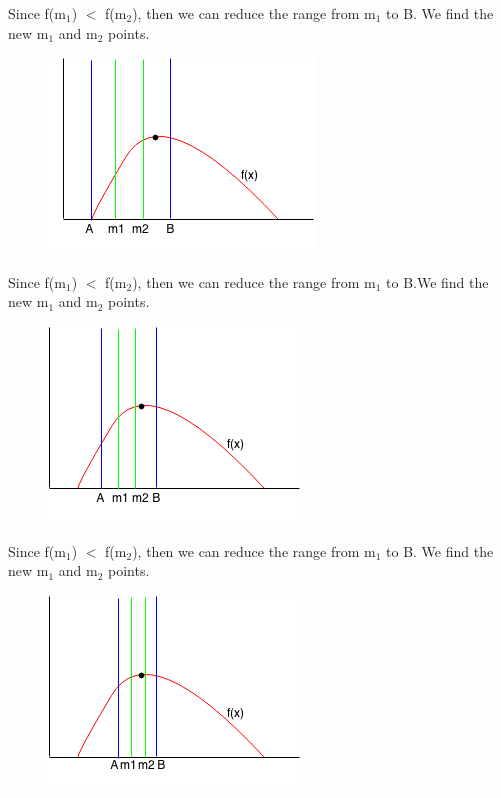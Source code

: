 \documentclass[11pt,oneside]{book}
\makeatletter
\def\maxwidth#1{\ifdim\Gin@nat@width>#1 #1\else\Gin@nat@width\fi}
\makeatother
\begin{document}
Since f(m$_{1}$) $<$ f(m$_{2}$), then we can reduce the range from m$_{1}$ to B. We find the new m$_{1}$ and m$_{2}$ points.

\vspace{5px}\begin{figure}[H]\centering
        \includegraphics[width=0.66\maxwidth{\textwidth}]{ternarysearch4.png}
        \end{figure}

Since f(m$_{1}$) $<$ f(m$_{2}$), then we can reduce the range from m$_{1}$ to B.We find the new m$_{1}$ and m$_{2}$ points.

\vspace{5px}\begin{figure}[H]\centering
        \includegraphics[width=0.66\maxwidth{\textwidth}]{ternarysearch5.png}
        \end{figure}

Since f(m$_{1}$) $<$ f(m$_{2}$), then we can reduce the range from m$_{1}$ to B. We find the new m$_{1}$ and m$_{2}$ points.

\vspace{5px}\begin{figure}[H]\centering
        \includegraphics[width=0.66\maxwidth{\textwidth}]{ternarysearch6.png}
        \end{figure}
\end{document}
